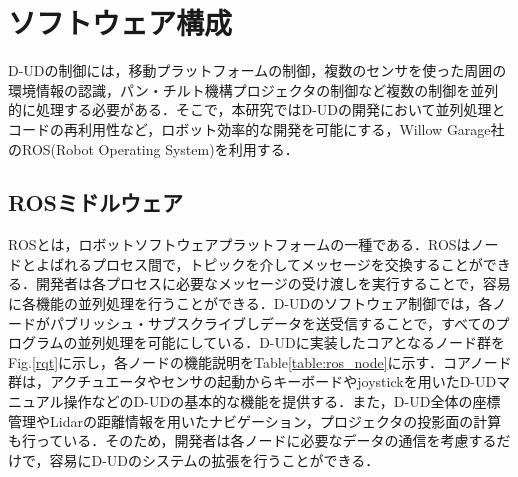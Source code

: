 \documentclass[12pt]{sonota/aislab}
\begin{document}


\section{ソフトウェア構成}
D-UDの制御には，移動プラットフォームの制御，複数のセンサを使った周囲の環境情報の認識，パン・チルト機構プロジェクタの制御など複数の制御を並列的に処理する必要がある．そこで，本研究ではD-UDの開発において並列処理とコードの再利用性など，ロボット効率的な開発を可能にする，Willow Garage社のROS(Robot Operating System)\cite{ROS}を利用する．

\subsection{ROSミドルウェア}
ROSとは，ロボットソフトウェアプラットフォームの一種である．ROSはノードとよばれるプロセス間で，トピックを介してメッセージを交換することができる．開発者は各プロセスに必要なメッセージの受け渡しを実行することで，容易に各機能の並列処理を行うことができる．D-UDのソフトウェア制御では，各ノードがパブリッシュ・サブスクライブしデータを送受信することで，すべてのプログラムの並列処理を可能にしている．D-UDに実装したコアとなるノード群をFig.\ref{rqt}に示し，各ノードの機能説明をTable\ref{table:ros_node}に示す．コアノード群は，アクチュエータやセンサの起動からキーボードやjoystickを用いたD-UDマニュアル操作などのD-UDの基本的な機能を提供する．また，D-UD全体の座標管理やLidarの距離情報を用いたナビゲーション，プロジェクタの投影面の計算も行っている．そのため，開発者は各ノードに必要なデータの通信を考慮するだけで，容易にD-UDのシステムの拡張を行うことができる．
\end{document}
